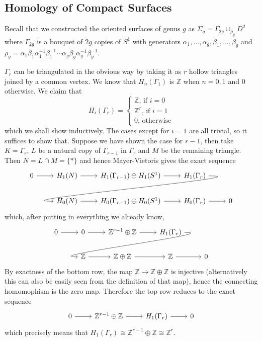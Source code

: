 \subsection{Homology of Compact Surfaces}
Recall that we constructed the oriented surfaces of genus $g$ as $\Sigma_g=\Gamma_{2g}\cup_{\rho_g}D^2$ where $\Gamma_{2g}$ is a bouquet of $2g$ copies of $S^1$ with generators $\alpha_1,\ldots,\alpha_g,\beta_1,\ldots,\beta_g$ and $\rho_g=\alpha_1\beta_1\alpha_1^{-1}\beta_1^{-1}\cdots \alpha_g\beta_g\alpha_g^{-1}\beta_g^{-1}$.
\begin{example}
    $\Gamma_r$ can be triangulated in the obvious way by taking it as $r$ hollow triangles joined by a common vertex.
    We know that $H_n(\Gamma_1)$ is $\mathbb Z$ when $n=0,1$ and $0$ otherwise.
    We claim that
    $$H_i(\Gamma_r)=\begin{cases}
        \mathbb Z\text{, if $i=0$}\\
        \mathbb Z^r\text{, if $i=1$}\\
        0\text{, otherwise}
    \end{cases}$$
    which we shall show inductively.
    The cases except for $i=1$ are all trivial, so it suffices to show that.
    Suppose we have shown the case for $r-1$, then take $K=\Gamma_r$, $L$ be a natural copy of $\Gamma_{r-1}$ in $\Gamma_r$ and $M$ be the remaining triangle.
    Then $N=L\cap M=\{\ast\}$ and hence Mayer-Vietoris gives the exact sequence
    \[
        \begin{tikzcd}
            0\arrow{r}&H_1(N)\arrow{r}&H_1(\Gamma_{r-1})\oplus H_1(S^1)\arrow{r}& H_1(\Gamma_r)\arrow[overlay, out=0, in=180]{dll}&\\
            &H_0(N)\arrow{r}&H_0(\Gamma_{r-1})\oplus H_0(S^1)\arrow{r}& H_0(\Gamma_r)\arrow{r}&0
        \end{tikzcd}
    \]
    which, after putting in everything we already know,
    \[
        \begin{tikzcd}
            0\arrow{r}&0\arrow{r}&\mathbb Z^{r-1}\oplus \mathbb Z\arrow{r}& H_1(\Gamma_r)\arrow[overlay, out=0, in=180]{dll}&\\
            &\mathbb Z\arrow{r}&\mathbb Z\oplus \mathbb Z\arrow{r}& \mathbb Z\arrow{r}&0
        \end{tikzcd}
    \]
    By exactness of the bottom row, the map $\mathbb Z\to\mathbb Z\oplus\mathbb Z$ is injective (alternatively this can also be easily seen from the definition of that map), hence the connecting homomophism is the zero map.
    Therefore the top row reduces to the exact sequence
    \[
        \begin{tikzcd}
            0\arrow{r}&\mathbb Z^{r-1}\oplus \mathbb Z\arrow{r}& H_1(\Gamma_r)\arrow{r}&0
        \end{tikzcd}
    \]
    which precisely means that $H_1(\Gamma_r)\cong\mathbb Z^{r-1}\oplus \mathbb Z\cong\mathbb Z^r$.
\end{example}
